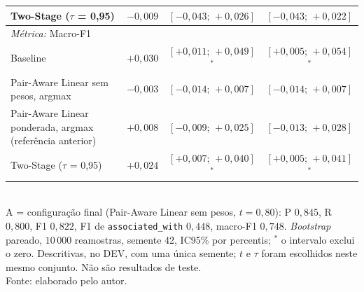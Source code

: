 \begin{table}[htbp]
{\begin{tabular}{lrcc}
\quad Two-Stage ($\tau$ = 0,95) & $-0{,}009$ & $[-0{,}043;\,+0{,}026]$ & $[-0{,}043;\,+0{,}022]$ \\
\midrule
\multicolumn{4}{l}{\textit{Métrica:} Macro-F1} \\
\quad Baseline & $+0{,}030$ & $[+0{,}011;\,+0{,}049]$$^{\ast}$ & $[+0{,}005;\,+0{,}054]$$^{\ast}$ \\
\quad Pair-Aware Linear sem pesos, argmax & $-0{,}003$ & $[-0{,}014;\,+0{,}007]$ & $[-0{,}014;\,+0{,}007]$ \\
\quad Pair-Aware Linear ponderada, argmax (referência anterior) & $+0{,}008$ & $[-0{,}009;\,+0{,}025]$ & $[-0{,}013;\,+0{,}028]$ \\
\quad Two-Stage ($\tau$ = 0,95) & $+0{,}024$ & $[+0{,}007;\,+0{,}040]$$^{\ast}$ & $[+0{,}005;\,+0{,}041]$$^{\ast}$ \\
  \bottomrule
  \end{tabular}}\\[2pt]
  {\footnotesize A = configuração final (Pair-Aware Linear sem pesos, $t=0{,}80$): P $0{,}845$, R $0{,}800$, F1 $0{,}822$, F1 de \texttt{associated\_with} $0{,}448$, macro-F1 $0{,}748$. \emph{Bootstrap} pareado, $10\,000$ reamostras, semente 42, IC95\% por percentis; $^{\ast}$ o intervalo exclui o zero. Descritivas, no DEV, com uma única semente; $t$ e $\tau$ foram escolhidos neste mesmo conjunto. Não são resultados de teste.}\\[4pt]
  {\footnotesize Fonte: elaborado pelo autor.}
\end{table}
